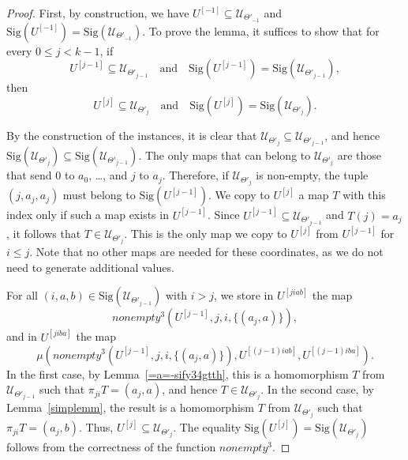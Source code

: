 \documentclass[10pt,a4paper]{amsart}
\begin{document}
\begin{proof}
First, by construction, we have $U^{[-1]} \subseteq \mathscr{U}_{\Theta'_{-1}}$ and $\mathrm{Sig}(U^{[-1]}) = \mathrm{Sig}(\mathscr{U}_{\Theta'_{-1}})$. To prove the lemma, it suffices to show that for every $0 \leq j < k-1$, if 
\[
U^{[j-1]} \subseteq \mathscr{U}_{\Theta'_{j-1}} \quad \text{and} \quad \mathrm{Sig}(U^{[j-1]}) = \mathrm{Sig}(\mathscr{U}_{\Theta'_{j-1}}),
\]
then
\[
U^{[j]} \subseteq \mathscr{U}_{\Theta'_{j}} \quad \text{and} \quad \mathrm{Sig}(U^{[j]}) = \mathrm{Sig}(\mathscr{U}_{\Theta'_{j}}).
\]

By the construction of the instances, it is clear that $\mathscr{U}_{\Theta'_{j}} \subseteq \mathscr{U}_{\Theta'_{j-1}}$, and hence $\mathrm{Sig}(\mathscr{U}_{\Theta'_{j}}) \subseteq \mathrm{Sig}(\mathscr{U}_{\Theta'_{j-1}})$. The only maps that can belong to $\mathscr{U}_{\Theta'_{j}}$ are those that send $0$ to $a_0$, \ldots , and $j$ to $a_j$. Therefore, if $\mathscr{U}_{\Theta'_{j}}$ is non-empty, the tuple $(j, a_j, a_j)$ must belong to $\mathrm{Sig}(U^{[j-1]})$. We copy to $U^{[j]}$ a map $T$ with this index only if such a map exists in $U^{[j-1]}$. Since $U^{[j-1]} \subseteq \mathscr{U}_{\Theta'_{j-1}}$ and $T(j) = a_j$, it follows that $T \in \mathscr{U}_{\Theta'_{j}}$. This is the only map we copy to $U^{[j]}$ from $U^{[j-1]}$ for $i \leq j$. Note that no other maps are needed for these coordinates, as we do not need to generate additional values.

For all $(i, a, b) \in \mathrm{Sig}(\mathscr{U}_{\Theta'_{j-1}})$ with $i > j$, we store in $U^{[j i a b]}$ the map $$nonempty^3(U^{[j-1]}, j, i, \{(a_j, a)\}),$$ and in $U^{[j i b a]}$ the map 
\[
\mu(nonempty^3(U^{[j-1]}, j, i, \{(a_j, a)\}), U^{[(j-1) i a b]}, U^{[(j-1) i b a]}).
\]
In the first case, by Lemma~\ref{=a=-sify34gtth}, this is a homomorphism $T$ from $\mathscr{U}_{\Theta'_{j-1}}$ such that $\pi_{j i} T = (a_j, a)$, and hence $T \in \mathscr{U}_{\Theta'_{j}}$. In the second case, by Lemma~\ref{simplemm}, the result is a homomorphism $T$ from $\mathscr{U}_{\Theta'_{j}}$ such that $\pi_{j i} T = (a_j, b)$. Thus, $U^{[j]} \subseteq \mathscr{U}_{\Theta'_{j}}$. The equality $\mathrm{Sig}(U^{[j]}) = \mathrm{Sig}(\mathscr{U}_{\Theta'_{j}})$ follows from the correctness of the function $nonempty^3$.
\end{proof}
\end{document}
